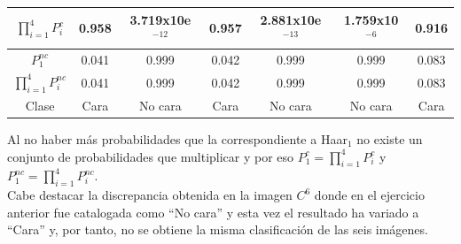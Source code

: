 \documentclass[10pt,a4paper]{article}
\begin{document}
\begin{enumerate}[label=\textbf{\alph*)}]
\begin{center}
\begin{tabular}{|c|c|c|c|c|c|c|}
\hline 
$\prod\limits_{i=1}^4 P^{c}_{i}$ & 0.958 & 3.719x10e$^{-12}$ & 0.957 & 2.881x10e$^{-13}$ &1.759x10$^{-6}$ & 0.916 \\ 
\hline 
$P^{nc}_{1}$ & 0.041 & 0.999 & 0.042 & 0.999 & 0.999 & 0.083 \\ 
\hline 
$\prod\limits_{i=1}^4 P^{nc}_{i}$ & 0.041 & 0.999 & 0.042 & 0.999 & 0.999 & 0.083 \\ 
\hline 
Clase & Cara & No cara & Cara & No cara & No cara & Cara\\ 
\hline 
\end{tabular}
\end{center}
Al no haber más probabilidades que la correspondiente a Haar$_{1}$ no existe un conjunto de probabilidades que multiplicar y por eso $P^{c}_{1} = \prod\limits_{i=1}^4 P^{c}_{i}$ y $P^{nc}_{1} = \prod\limits_{i=1}^4 P^{nc}_{i}$.\\
Cabe destacar la discrepancia obtenida en la imagen $C^{6}$ donde en el ejercicio anterior fue catalogada como ``No cara'' y esta vez el resultado ha variado a ``Cara'' y, por tanto, no se obtiene la misma clasificación de las seis imágenes.
\end{enumerate}
\section{}
\end{document}
